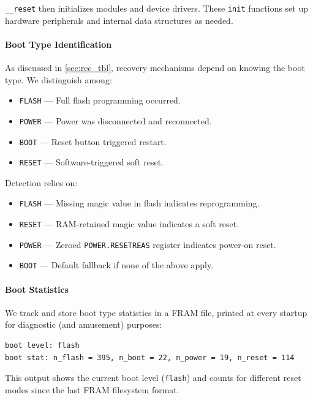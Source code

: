 \lstinline[style=myagc]|__reset| then initializes modules and device drivers. These
\lstinline[style=myagc]|init| functions set up hardware peripherals and internal data
structures as needed.

\paragraph*{Boot Type Identification} 

As discussed in \autoref{sec:rec_tbl}, recovery mechanisms depend on knowing the boot
type. We distinguish among:
\begin{itemize}
    \item \texttt{FLASH} — Full flash programming occurred.
    \item \texttt{POWER} — Power was disconnected and reconnected.
    \item \texttt{BOOT} — Reset button triggered restart.
    \item \texttt{RESET} — Software-triggered soft reset.
\end{itemize}

Detection relies on:
\begin{itemize}
    \item \texttt{FLASH} — Missing magic value in flash indicates reprogramming.
    \item \texttt{RESET} — RAM-retained magic value indicates a soft reset.
    \item \texttt{POWER} — Zeroed \lstinline[style=myagc]|POWER.RESETREAS| register
        indicates power-on reset.
    \item \texttt{BOOT} — Default fallback if none of the above apply.
\end{itemize}

\paragraph*{Boot Statistics} 

We track and store boot type statistics in a FRAM file, printed at every startup for
diagnostic (and amusement) purposes:
\begin{lstlisting}[style=mytxt]
boot level: flash
boot stat: n_flash = 395, n_boot = 22, n_power = 19, n_reset = 114
\end{lstlisting}

This output shows the current boot level (\texttt{flash}) and counts for different reset
modes since the last FRAM filesystem format.


